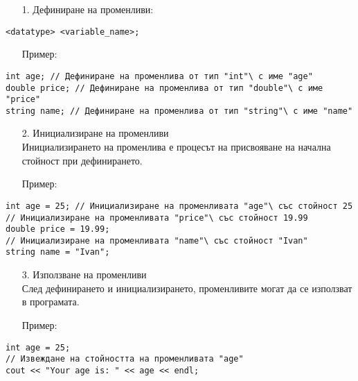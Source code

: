 \documentclass[oneside]{book}
\begin{document}
\begin{enumerate}\item[1.] Дефиниране на променливи:\end{enumerate}
\begin{mdframed}\begin{lstlisting}
<datatype> <variable_name>;
\end{lstlisting}\end{mdframed}
\begin{itemize}\item[Пример:] \end{itemize}
\begin{mdframed}\begin{lstlisting}
int age; // Дефиниране на променлива от тип "int"\ с име "age"
double price; // Дефиниране на променлива от тип "double"\ с име "price"
string name; // Дефиниране на променлива от тип "string"\ с име "name"
\end{lstlisting}\end{mdframed}
\begin{enumerate}\item [2.] Инициализиране на променливи\\Инициализирането на променлива е процесът на присвояване на начална стойност при дефинирането.\end{enumerate}
\begin{itemize}\item[Пример:]\end{itemize}
\begin{mdframed}\begin{lstlisting}
int age = 25; // Инициализиране на променливата "age"\ със стойност 25
// Инициализиране на променливата "price"\ със стойност 19.99
double price = 19.99;
// Инициализиране на променливата "name"\ със стойност "Ivan"
string name = "Ivan";
\end{lstlisting}\end{mdframed}
\begin{enumerate}\item[3.] Използване на променливи\\След дефинирането и инициализирането, променливите могат да се използват в програмата.\end{enumerate}
\begin{itemize}\item[Пример:]\end{itemize}
\begin{mdframed}\begin{lstlisting}
int age = 25;
// Извеждане на стойността на променливата "age"
cout << "Your age is: " << age << endl;
\end{lstlisting}\end{mdframed}
\end{document}
